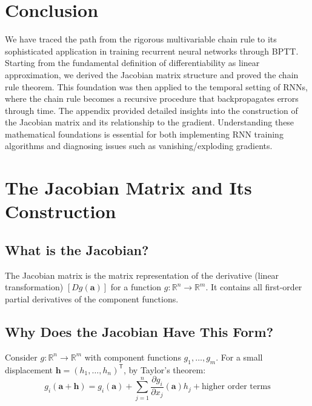\begin{notechapter}
\section{Conclusion}
We have traced the path from the rigorous multivariable chain rule to its
sophisticated application in training recurrent neural networks through BPTT.
Starting from the fundamental definition of differentiability as linear
approximation, we derived the Jacobian matrix structure and proved the chain
rule theorem. This foundation was then applied to the temporal setting of RNNs,
where the chain rule becomes a recursive procedure that backpropagates errors
through time. The appendix provided detailed insights into the construction of
the Jacobian matrix and its relationship to the gradient. Understanding these
mathematical foundations is essential for both implementing RNN training
algorithms and diagnosing issues such as vanishing/exploding gradients.

\newpage
\chapterappendix

\section*{ The Jacobian Matrix and Its Construction}

\subsection{What is the Jacobian?}
The Jacobian matrix is the matrix representation of the derivative (linear
transformation) $[Dg(\mathbf{a})]$ for a function $g: \mathbb{R}^n \to
\mathbb{R}^m$. It contains all first-order partial derivatives of the component
functions.

\subsection{Why Does the Jacobian Have This Form?}
Consider $g: \mathbb{R}^n \to \mathbb{R}^m$ with component functions $g_1,
\dots, g_m$. For a small displacement $\mathbf{h} = (h_1, \dots, h_n)^\mathsf{T}$, by
Taylor's theorem:
\[
g_i(\mathbf{a} + \mathbf{h}) = g_i(\mathbf{a}) + \sum_{j=1}^n \frac{\partial g_i}{\partial x_j}(\mathbf{a}) h_j + \text{higher order terms}
\]


\end{notechapter}
